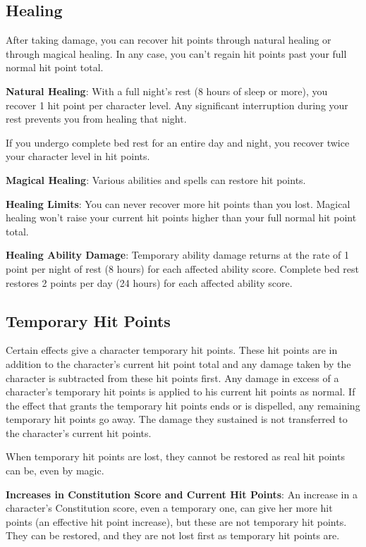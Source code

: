\subsection{Healing}

				
After taking damage, you can recover hit points through natural healing or through magical healing. In any case, you can't regain hit points past your full normal hit point total.
				
\textbf{Natural Healing}: With a full night's rest (8 hours of sleep or more), you recover 1 hit point per character level. Any significant interruption during your rest prevents you from healing that night.
				
If you undergo complete bed rest for an entire day and night, you recover twice your character level in hit points. 
				
\textbf{Magical Healing}: Various abilities and spells can restore hit points.
				
\textbf{Healing Limits}: You can never recover more hit points than you lost. Magical healing won't raise your current hit points higher than your full normal hit point total.
				
\textbf{Healing Ability Damage}: Temporary ability damage returns at the rate of 1 point per night of rest (8 hours) for each affected ability score. Complete bed rest restores 2 points per day (24 hours) for each affected ability score.
				
\subsection{Temporary Hit Points}

				
Certain effects give a character temporary hit points. These hit points are in addition to the character's current hit point total and any damage taken by the character is subtracted from these hit points first. Any damage in excess of a character's temporary hit points is applied to his current hit points as normal. If the effect that grants the temporary hit points ends or is dispelled, any remaining temporary hit points go away. The damage they sustained is not transferred to the character's current hit points.
				
When temporary hit points are lost, they cannot be restored as real hit points can be, even by magic.
				
\textbf{Increases in Constitution Score and Current Hit Points}: An increase in a character's Constitution score, even a temporary one, can give her more hit points (an effective hit point increase), but these are not temporary hit points. They can be restored, and they are not lost first as temporary hit points are.
				
